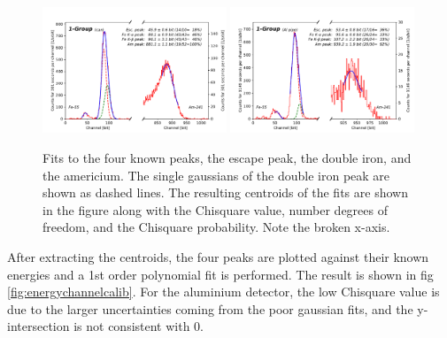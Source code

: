 \begin{figure}[htb]
  \includegraphics[width=0.49\textwidth,page=1]{graphics/channelfits.pdf}
  \includegraphics[width=0.49\textwidth,page=1]{graphics/aluchannelfits.pdf}
  \caption{Fits to the four known peaks, the escape peak, the double iron, and the americium. The single gaussians of the double iron peak are shown as dashed lines. The resulting centroids of the fits are shown in the figure along with the Chisquare value, number degrees of freedom, and the Chisquare probability. Note the broken x-axis.}
  \label{fig:channelfits}
\end{figure}

After extracting the centroids, the four peaks are plotted against their known energies and a 1st order polynomial fit is performed. The result is shown in fig \ref{fig:energychannelcalib}. For the aluminium detector, the low Chisquare value is due to the larger uncertainties coming from the poor gaussian fits, and the y-intersection is not consistent with 0.

